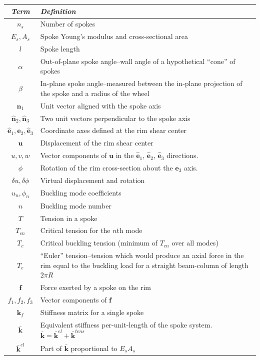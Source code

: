 \documentclass{bmd2016p}
\newcommand{\e}{\ensuremath{\hat{\bm{e}}_1}}
\newcommand{\ee}{\ensuremath{\hat{\bm{e}}_2}}
\newcommand{\eee}{\ensuremath{\hat{\bm{e}}_3}}
\newcommand{\n}{\ensuremath{\hat{\bm{n}}_1}}
\newcommand{\nn}{\ensuremath{\hat{\bm{n}}_2}}
\newcommand{\nnn}{\ensuremath{\hat{\bm{n}}_3}}
\begin{document}
\begin{tabular}{c|p{12cm}}
\hline
\textit{\textbf{Term}} & \textit{\textbf{Definition}} \\
\hline
$n_s$		& Number of spokes\\
$E_s, A_s$	& Spoke Young's modulus and cross-sectional area\\
$l$			& Spoke length\\
$\alpha$	& Out-of-plane spoke angle--wall angle of a hypothetical ``cone'' of spokes\\
$\beta$		& In-plane spoke angle--measured between the in-plane projection of the spoke and
			  a radius of the wheel\\
$\n$		& Unit vector aligned with the spoke axis\\
$\nn,\nnn$	& Two unit vectors perpendicular to the spoke axis\\
$\e,\ee,\eee$ & Coordinate axes defined at the rim shear center\\
$\bm{u}$	& Displacement of the rim shear center\\
$u,v,w$		& Vector components of $\bm{u}$ in the \e{}, \ee{}, \eee{} directions.\\
$\phi$		& Rotation of the rim cross-section about the $\hat{\bm{e}}_3$ axis.\\
$\delta u, \delta \phi$ & Virtual displacement and rotation\\
$u_n, \phi_n$ & Buckling mode coefficients\\
$n$			& Buckling mode number\\
$T$			& Tension in a spoke\\
$T_{cn}$	& Critical tension for the $n$th mode\\
$T_c$		& Critical buckling tension (minimum of $T_{cn}$ over all modes)\\
$T_e$		& ``Euler'' tension--tension which would produce an axial force in the rim
			  equal to the buckling load for a straight beam-column of length $2\pi R$\\
$\bm{f}$	& Force exerted by a spoke on the rim\\
$f_1, f_2,f_3$ & Vector components of $\bm{f}$\\
$\bm{k}_f$	& Stiffness matrix for a single spoke\\
$\bar{\bm{k}}$ & Equivalent stiffness per-unit-length of the spoke system. $\bar{\bm{k}} = \bar{\bm{k}}^{el} + \bar{\bm{k}}^{tens}$\\
$\bar{\bm{k}}^{el}$ & Part of $\bar{\bm{k}}$ proportional to $E_sA_s$\\

\end{tabular}
\end{document}
